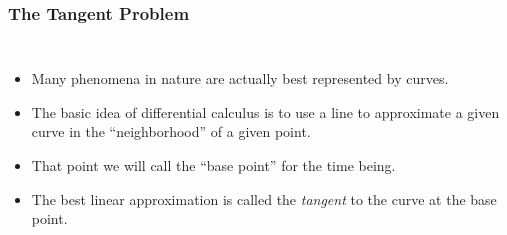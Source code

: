 \documentclass[serif,ignorenonframetext]{beamer}
\begin{document}
\begin{frame}
  \frametitle{The Tangent Problem}
  \begin{columns}
    \begin{itemize}[<+->]
    \item Many phenomena in nature are actually best represented by
      curves.
    \item The basic idea of differential calculus is to use a line to
      approximate a given curve in the ``neighborhood'' of a given
      point.
    \item That point we will call the ``base point'' for the time
      being.
    \item The best linear approximation is called the \emph{tangent}
      to the curve at the base point.
    \end{itemize}

\end{columns}
\end{frame}
\end{document}
